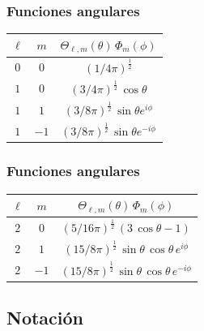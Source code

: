 \documentclass[12pt]{beamer}
\begin{document}
\begin{frame}
\frametitle{Funciones angulares}
\begin{table}[H]
\centering
\renewcommand{\arraystretch}{1.5}
\begin{tabular}{|c | c | c|} \hline
$\ell$ & $m$ & $\Theta_{\ell, m} (\theta) \, \Phi_{m} (\phi)$ \\ \hline
$0$ & $0$ & $(1/4 \pi)^{\frac{1}{2}}$ \\ \hline
$1$ & $0$ & $(3/4 \pi)^{\frac{1}{2}} \, \cos \theta$ \\ \hline
$1$ & $1$ & $(3/8 \pi)^{\frac{1}{2}} \, \sin \theta e^{i \phi}$ \\ \hline
$1$ & $-1$ & $(3/8 \pi)^{\frac{1}{2}} \, \sin \theta e^{-i \phi}$ \\ \hline
\end{tabular}
\end{table}
\end{frame}
\begin{frame}
\frametitle{Funciones angulares}
\begin{table}[H]
\centering
\renewcommand{\arraystretch}{1.5}
\begin{tabular}{|c | c | c|} \hline
$\ell$ & $m$ & $\Theta_{\ell, m} (\theta) \, \Phi_{m} (\phi)$ \\ \hline    
$2$ & $0$ & $(5/16 \pi)^{\frac{1}{2}} \, (3 \, \cos \theta - 1)$ \\ \hline
$2$ & $1$ & $(15/8 \pi)^{\frac{1}{2}} \, \sin \theta \, \cos \theta \, e^{i \phi}$ \\ \hline
$2$ & $-1$ & $(15/8 \pi)^{\frac{1}{2}} \, \sin \theta \, \cos \theta \, e^{-i \phi}$ \\ \hline
\end{tabular}
\end{table}
\end{frame}

\subsection{Notación}
\end{document}
